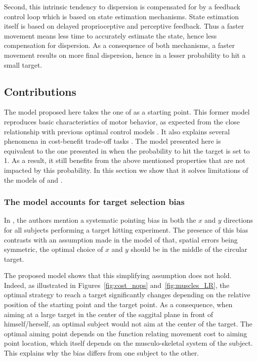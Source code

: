 \documentclass[10pt]{article}
\begin{document}
Second, this intrinsic tendency to dispersion is compensated for by a feedback control loop which is based on state estimation mechanisms.
State estimation itself is based on delayed proprioceptive and perceptive feedback. Thus a faster movement means less time to accurately estimate the state, hence less compensation for dispersion.
As a consequence of both mechanisms, a faster movement results on more final dispersion, hence in a lesser probability to hit a small target.

\subsection{Contributions}

The model proposed here takes the one of \cite{rigoux12} as a starting point. This former model reproduces basic characteristics of motor behavior, as expected from the close relationship with previous optimal control models \cite{gordon94,shadmehr94,todorov02_NN,guigon07a,liu07,guigon08b}. It also explains several phenomena in cost-benefit trade-off tasks \cite{watanabe03,rudebeck06}. The model presented here is equivalent to the one presented in \cite{rigoux12} when the probability to hit the target is set to 1. As a result, it still benefits from the above mentioned properties that are not impacted by this probability.
In this section we show that it solves limitations of the models of \cite{Dean2007} and \cite{rigoux12}.

\subsubsection{The model accounts for target selection bias}

In \cite{Trommershauser2003a}, the authors mention a systematic pointing bias in both the $x$ and $y$ directions for all subjects performing a target hitting experiment. The presence of this bias contrasts with an assumption made in the model of \cite{Dean2007} that, spatial errors being symmetric, the optimal choice of $x$ and $y$ should be in the middle of the circular target.

The proposed model shows that this simplifying assumption does not hold. Indeed, as illustrated in Figures~\ref{fig:cost_nops} and~\ref{fig:muscles_LR}, the optimal strategy to reach a target significantly changes depending on the relative position of the starting point and the target point. As a consequence, when aiming at a large target in the center of the saggital plane in front of himself/herself, an optimal subject would not aim at the center of the target. The optimal aiming point depends on the function relating movement cost to aiming point location, which itself depends on the musculo-skeletal system of the subject. This explains why the bias differs from one subject to the other.
\end{document}
